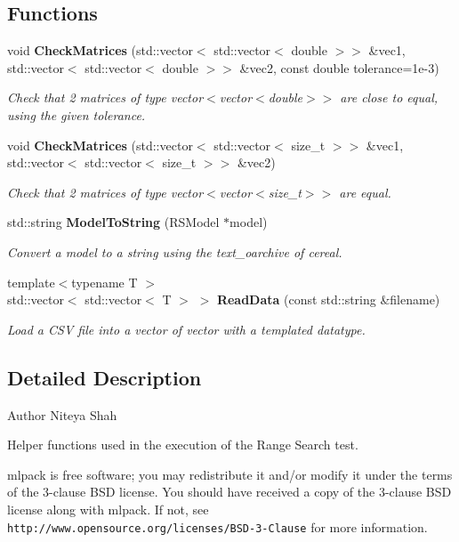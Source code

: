\subsection*{Functions}
\begin{DoxyCompactItemize}
\item 
void \textbf{ Check\+Matrices} (std\+::vector$<$ std\+::vector$<$ double $>$$>$ \&vec1, std\+::vector$<$ std\+::vector$<$ double $>$$>$ \&vec2, const double tolerance=1e-\/3)
\begin{DoxyCompactList}\small\item\em Check that 2 matrices of type vector$<$vector$<$double$>$$>$ are close to equal, using the given tolerance. \end{DoxyCompactList}\item 
void \textbf{ Check\+Matrices} (std\+::vector$<$ std\+::vector$<$ size\+\_\+t $>$$>$ \&vec1, std\+::vector$<$ std\+::vector$<$ size\+\_\+t $>$$>$ \&vec2)
\begin{DoxyCompactList}\small\item\em Check that 2 matrices of type vector$<$vector$<$size\+\_\+t$>$$>$ are equal. \end{DoxyCompactList}\item 
std\+::string \textbf{ Model\+To\+String} (R\+S\+Model $\ast$model)
\begin{DoxyCompactList}\small\item\em Convert a model to a string using the text\+\_\+oarchive of cereal. \end{DoxyCompactList}\item 
{\footnotesize template$<$typename T $>$ }\\std\+::vector$<$ std\+::vector$<$ T $>$ $>$ \textbf{ Read\+Data} (const std\+::string \&filename)
\begin{DoxyCompactList}\small\item\em Load a C\+SV file into a vector of vector with a templated datatype. \end{DoxyCompactList}\end{DoxyCompactItemize}


\subsection{Detailed Description}
\begin{DoxyAuthor}{Author}
Niteya Shah
\end{DoxyAuthor}
Helper functions used in the execution of the Range Search test.

mlpack is free software; you may redistribute it and/or modify it under the terms of the 3-\/clause B\+SD license. You should have received a copy of the 3-\/clause B\+SD license along with mlpack. If not, see {\tt http\+://www.\+opensource.\+org/licenses/\+B\+S\+D-\/3-\/\+Clause} for more information. 

